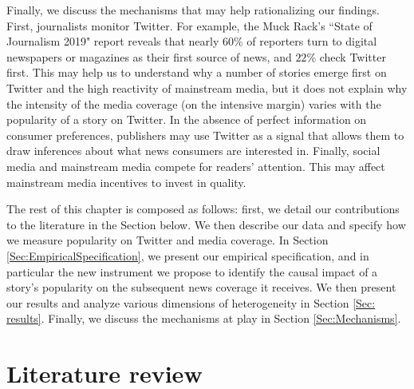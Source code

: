 Finally, we discuss the mechanisms that may help rationalizing our findings. First, journalists monitor Twitter. For example, the Muck Rack’s  ``State of Journalism 2019" report reveals that nearly $60\%$ of reporters turn to digital newspapers or magazines as their first source of news, and $22\%$ check Twitter first. This may help us to understand why a number of stories emerge first on Twitter and the high reactivity of mainstream media, but it does not explain why the intensity of the media coverage (on the intensive margin) varies with the popularity of a story on Twitter. In the absence of perfect information on consumer preferences, publishers may use Twitter as a signal that allows them to draw inferences about what news consumers are interested in. Finally, social media and mainstream media compete for readers' attention. This may affect mainstream media incentives to invest in quality.

\medskip
The rest of this chapter is composed as follows: first, we detail our contributions to the literature in the Section below.  We then describe our data and specify how we measure popularity on Twitter and media coverage. In Section \ref{Sec:EmpiricalSpecification}, we present our empirical specification, and in particular the new instrument we propose to identify the causal impact of a story's popularity on the subsequent news coverage it receives. We then present our results and analyze various dimensions of heterogeneity in Section \ref{Sec: results}. Finally, we discuss the mechanisms at play in Section \ref{Sec:Mechanisms}.

\section{Literature review}

